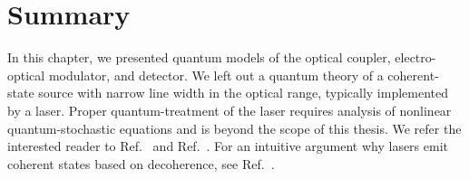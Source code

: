 \section*{Summary}

In this chapter, we presented quantum models of the optical coupler, electro-optical modulator, and detector.
We left out a quantum theory of a coherent-state source with narrow line width in the optical range, typically implemented by a laser.
Proper quantum-treatment of the laser requires analysis of nonlinear quantum-stochastic equations and is beyond the scope of this thesis.
We refer the interested reader to Ref.~\cite[p.~900]{Mandel1995} and Ref.~\cite{Haken2012,Gardiner2000}.
For an intuitive argument why lasers emit coherent states based on decoherence, see Ref.~\cite{Gea1998}.

